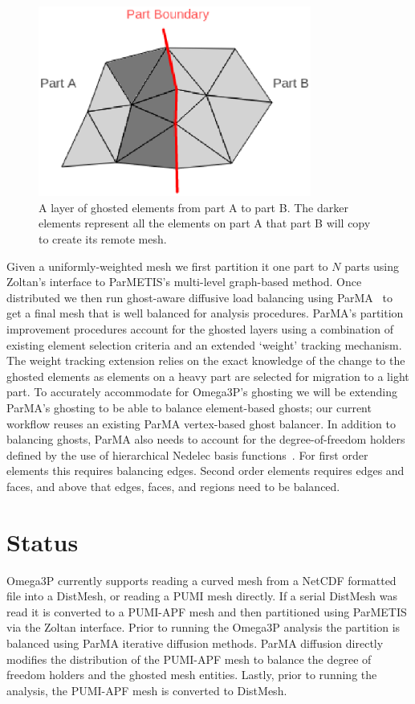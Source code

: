 \documentclass[a4paper]{article}
\begin{document}
\begin{figure}[ht]
\centering
\includegraphics[width=0.8\textwidth]{ghost.eps} 
\caption{\label{fig:ghost3} A layer of ghosted elements from part A to part B. The darker elements represent all the elements on part A that part B will copy to create its remote mesh.}
\end{figure}

Given a
uniformly-weighted mesh we first partition it one part to $N$ parts using
Zoltan's interface to ParMETIS's multi-level graph-based method.
Once distributed we then run ghost-aware diffusive load balancing using
ParMA~\cite{SmithParma2015} to get a final mesh that is well balanced for
analysis procedures.
ParMA's partition improvement procedures account for
the ghosted layers using a combination of existing element selection criteria
and an extended `weight' tracking mechanism.
The weight tracking extension relies on the exact knowledge of the change to the
ghosted elements as elements on a heavy part are selected for migration to a
light part.
To accurately accommodate for Omega3P's ghosting we will be extending ParMA's
ghosting to be able to balance element-based ghosts; our current
workflow reuses an existing ParMA vertex-based ghost balancer.
In addition to balancing ghosts, ParMA also needs to account for the
degree-of-freedom holders defined by the use of hierarchical Nedelec basis
functions~\cite{ingelstrom2006new}.
For first order elements this requires balancing edges.
Second order elements requires edges and faces, and above that edges, faces, and
regions need to be balanced.

\section{Status}
Omega3P currently supports reading a curved mesh from a NetCDF formatted file
into a DistMesh, or reading a PUMI mesh directly.
If a serial DistMesh was read it is converted to a PUMI-APF mesh and then 
partitioned using ParMETIS via the Zoltan interface.
Prior to running the Omega3P analysis the partition is balanced using ParMA
iterative diffusion methods.
ParMA diffusion directly modifies the distribution of the PUMI-APF mesh to
balance the degree of freedom holders and the ghosted mesh entities.
Lastly, prior to running the analysis, the PUMI-APF mesh is converted to
DistMesh.
\end{document}
